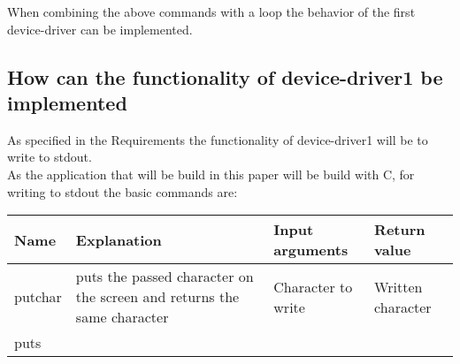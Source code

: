 When combining the above commands with a loop the behavior of the first
device-driver can be implemented.

\hypertarget{how-can-the-functionality-of-device-driver1-be-implemented}{%
\subsection{How can the functionality of device-driver1 be
implemented}\label{how-can-the-functionality-of-device-driver1-be-implemented}}

As specified in the Requirements the functionality of device-driver1
will be to write to stdout.\\
As the application that will be build in this paper will be build with
C, for writing to stdout the basic commands are:

\begin{longtable}[]{@{}llll@{}}
\toprule
\begin{minipage}[b]{0.11\columnwidth}\raggedright
Name\strut
\end{minipage} & \begin{minipage}[b]{0.23\columnwidth}\raggedright
Explanation\strut
\end{minipage} & \begin{minipage}[b]{0.30\columnwidth}\raggedright
Input arguments\strut
\end{minipage} & \begin{minipage}[b]{0.25\columnwidth}\raggedright
Return value\strut
\end{minipage}\tabularnewline
\midrule
\endhead
\begin{minipage}[t]{0.11\columnwidth}\raggedright
putchar\strut
\end{minipage} & \begin{minipage}[t]{0.23\columnwidth}\raggedright
puts the passed character on the screen and returns the same
character\strut
\end{minipage} & \begin{minipage}[t]{0.30\columnwidth}\raggedright
Character to write\strut
\end{minipage} & \begin{minipage}[t]{0.25\columnwidth}\raggedright
Written character\strut
\end{minipage}\tabularnewline
\begin{minipage}[t]{0.11\columnwidth}\raggedright
puts\strut
\end{minipage} & \begin{minipage}[t]{0.23\columnwidth}\raggedright

\end{minipage}
\end{longtable}
